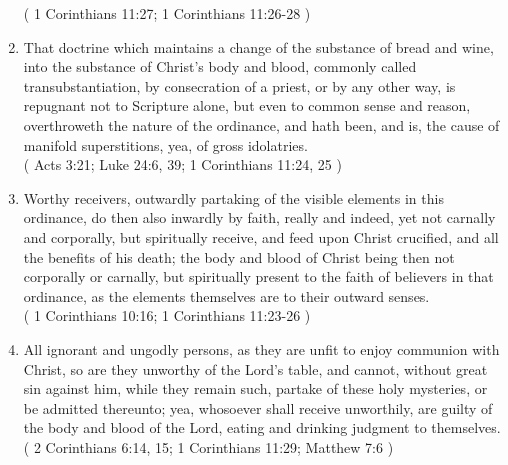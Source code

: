 \documentclass[12pt,a4paper]{book}
\begin{document}
\begin{enumerate}
( 1 Corinthians 11:27; 1 Corinthians 11:26-28 )
\item
\label{ch-lor-sup-6}
That doctrine which maintains a change of the substance of bread and wine, into the substance of Christ's body and blood, commonly called transubstantiation, by consecration of a priest, or by any other way, is repugnant not to Scripture alone, but even to common sense and reason, overthroweth the nature of the ordinance, and hath been, and is, the cause of manifold superstitions, yea, of gross idolatries.\\
( Acts 3:21; Luke 24:6, 39; 1 Corinthians 11:24, 25 )
\item
\label{ch-lor-sup-7}
Worthy receivers, outwardly partaking of the visible elements in this ordinance, do then also inwardly by faith, really and indeed, yet not carnally and corporally, but spiritually receive, and feed upon Christ crucified, and all the benefits of his death; the body and blood of Christ being then not corporally or carnally, but spiritually present to the faith of believers in that ordinance, as the elements themselves are to their outward senses.\\
( 1 Corinthians 10:16; 1 Corinthians 11:23-26 )
\item
\label{ch-lor-sup-8}
All ignorant and ungodly persons, as they are unfit to enjoy communion with Christ, so are they unworthy of the Lord's table, and cannot, without great sin against him, while they remain such, partake of these holy mysteries, or be admitted thereunto; yea, whosoever shall receive unworthily, are guilty of the body and blood of the Lord, eating and drinking judgment to themselves.\\
( 2 Corinthians 6:14, 15; 1 Corinthians 11:29; Matthew 7:6 )
\end{enumerate}
\end{document}
